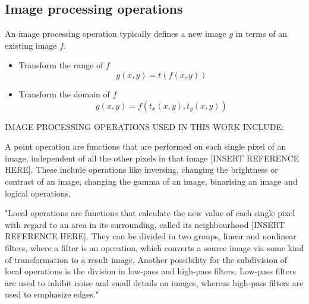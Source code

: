 \subsection{Image processing operations}

An image processing operation typically defines a new image \( g \) in terms of an existing image \( f \).
\begin{itemize}
	\item Transform the range of \( f \)
	\[ 
	g(x, y) = t(f(x,y)) 
	\]
	\item Transform the domain of \( f \)
	\[
	g(x,y) = f(t_{x}(x,y), t_{y}(x,y))
	\]
\end{itemize}

IMAGE PROCESSING OPERATIONS USED IN THIS WORK INCLUDE: 

A point operation are functions that are performed on each single pixel of an image, independent of all the other pixels in that image [INSERT REFERENCE HERE]. These include operations like inversing, changing the brightness or contrast of an image, changing the gamma of an image, binarising an image and logical operations. 

"Local operations are functions that calculate the new value of each single pixel with regard to an area in its surrounding, called its neighbourhood [INSERT REFERENCE HERE]. They can be divided in two groups, linear and nonlinear filters, where a filter is an operation, which converts a source image via some kind of transformation to a result image. Another possibility for the subdivision of local operations is the division in low-pass and high-pass filters. Low-pass filters are used to inhibit noise and small details on images, whereas high-pass filters are used to emphasize edges."

